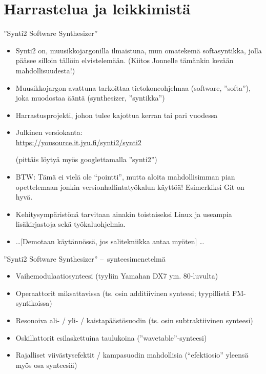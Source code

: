 \documentclass[pdf,9pt,handout]{beamer}
\begin{document}
\section{Harrastelua ja leikkimistä}
\begin{frame}{''Synti2 Software Synthesizer''}
\begin{itemize}
  \item Synti2 on, muusikkojargonilla ilmaistuna, mun omatekemä
    softasyntikka, jolla pääsee silloin tällöin elvistelemään. (Kiitos
    Jonnelle tämänkin kevään mahdollisuudesta!)
  \item Muusikkojargon avattuna tarkoittaa tietokoneohjelmaa
    (software, ''softa''), joka muodostaa ääntä (synthesizer,
    ''syntikka'')
  \item Harrastusprojekti, johon tulee kajottua kerran tai pari vuodessa
  \item Julkinen versiokanta:\\ \small{\url{https://yousource.it.jyu.fi/synti2/synti2}}

    (pittäis löytyä myös googlettamalla ''synti2'')

  \item[] BTW: Tämä ei vielä ole ``pointti'', mutta aloita
    mahdollisimman pian opettelemaan jonkin versionhallintatyökalun
    käyttöä! Esimerkiksi Git on hyvä.
  \item Kehitysympäristönä tarvitaan ainakin toistaiseksi Linux ja
    useampia lisäkirjastoja sekä työkaluohjelmia.
    
  \item \ldots [Demotaan käytännössä, jos salitekniikka antaa myöten]
    \ldots

\end{itemize}
\end{frame}

\begin{frame}{''Synti2 Software Synthesizer'' --~synteesimenetelmä}

  \begin{itemize}
  \item Vaihemodulaatiosynteesi (tyyliin Yamahan DX7 ym. 80-luvulta)
  \item Operaattorit miksattavissa (ts. osin additiivinen synteesi;
    tyypillistä FM-syntikoissa)
  \item Resonoiva ali- / yli- / kaistapäästösuodin (ts. osin
    subtraktiivinen synteesi)
  \item Oskillattorit esilaskettuina taulukoina
    (''wavetable''-synteesi)
  \item Rajalliset viivästysefektit / kampasuodin mahdollisia (``efektiosio'' yleensä myös osa synteesiä)
  \end{itemize}
\end{frame}
\end{document}
